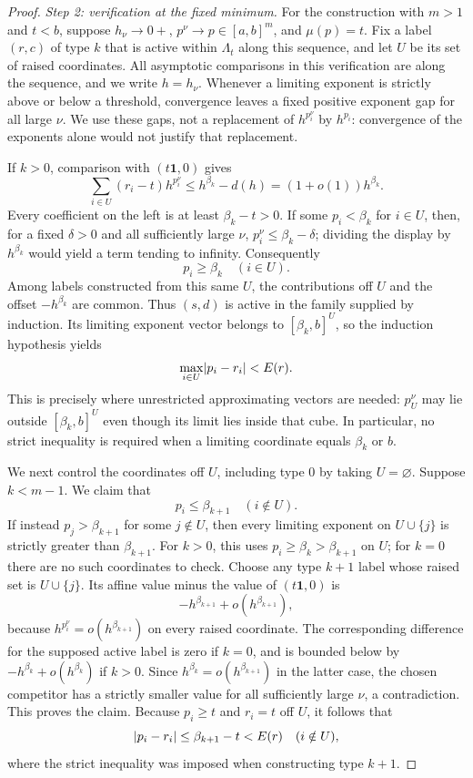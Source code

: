 \begin{proof}
\medskip
\noindent\emph{Step 2: verification at the fixed minimum.}
For the construction with $m>1$ and $t<b$, suppose $h_\nu\to0+$,
$p^\nu\to p\in[a,b]^m$, and $\mu(p)=t$.
Fix a label $(r,c)$ of type $k$ that is active within $\Lambda_t$ along this
sequence, and let $U$ be its set of raised coordinates.  All asymptotic
comparisons in this verification are along the sequence, and we write
$h=h_\nu$. Whenever a limiting exponent is strictly above or below a
threshold, convergence leaves a fixed positive exponent gap for all large
$\nu$. We use these gaps, not a replacement of $h^{p_i^\nu}$ by
$h^{p_i}$: convergence of the exponents alone would not justify that
replacement.

If $k>0$, comparison with $(t\mathbf 1,0)$ gives
\[
  \sum_{i\in U}(r_i-t)h^{p_i^\nu}
  \leq h^{\beta_k}-d(h)
  =(1+o(1))h^{\beta_k}.
\]
Every coefficient on the left is at least $\beta_k-t>0$.  If some
$p_i<\beta_k$ for $i\in U$, then, for a fixed $\delta>0$ and all
sufficiently large $\nu$, $p_i^\nu\leq\beta_k-\delta$; dividing the
display by $h^{\beta_k}$ would yield a term tending to infinity.
Consequently
\[
  p_i\geq\beta_k\quad(i\in U).
\]
Among labels constructed from this same $U$, the contributions off $U$
and the offset $-h^{\beta_k}$ are common.  Thus $(s,d)$ is active in the
family supplied by induction.  Its limiting exponent vector belongs to
$[\beta_k,b]^U$, so the induction hypothesis yields
\[
  \max_{i\in U}\lvert p_i-r_i\rvert<E(r).
\]
This is precisely where unrestricted approximating vectors are needed:
$p_U^\nu$ may lie outside $[\beta_k,b]^U$ even though its limit lies
inside that cube. In particular, no strict inequality is required when a
limiting coordinate equals $\beta_k$ or $b$.

We next control the coordinates off $U$, including type $0$ by taking
$U=\varnothing$.  Suppose $k<m-1$.  We claim that
\[
  p_i\leq\beta_{k+1}\quad(i\notin U).
\]
If instead $p_j>\beta_{k+1}$ for some $j\notin U$, then every limiting
exponent on $U\cup\{j\}$ is strictly greater than $\beta_{k+1}$.
For $k>0$, this uses $p_i\geq\beta_k>\beta_{k+1}$ on $U$; for $k=0$
there are no such coordinates to check.  Choose any type $k+1$ label
whose raised set is $U\cup\{j\}$.  Its affine value minus the value of
$(t\mathbf 1,0)$ is
\[
  -h^{\beta_{k+1}}+o(h^{\beta_{k+1}}),
\]
because $h^{p_i^\nu}=o(h^{\beta_{k+1}})$ on every raised coordinate.
The corresponding difference for the supposed active label is zero if
$k=0$, and is bounded below by
$-h^{\beta_k}+o(h^{\beta_k})$ if $k>0$.
Since $h^{\beta_k}=o(h^{\beta_{k+1}})$ in the latter case, the chosen
competitor has a strictly smaller value for all sufficiently large $\nu$,
a contradiction.  This proves the claim.  Because $p_i\geq t$ and
$r_i=t$ off $U$, it follows that
\[
  \lvert p_i-r_i\rvert\leq\beta_{k+1}-t<E(r)
  \quad(i\notin U),
\]
where the strict inequality was imposed when constructing type $k+1$.


\end{proof}
